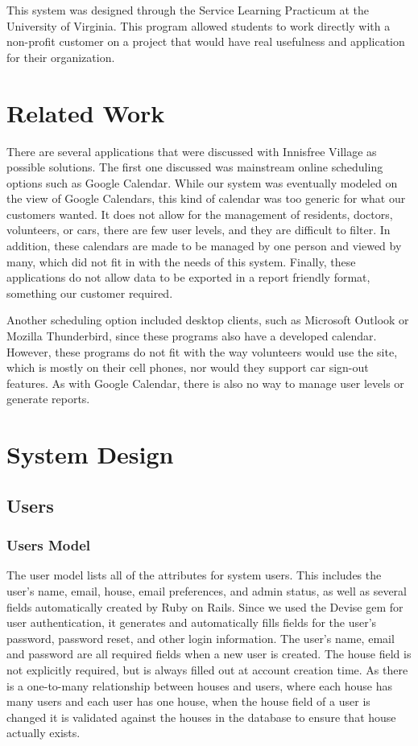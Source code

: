 \documentclass{sig-alternate}
\begin{document}
This system was designed through the Service Learning Practicum at the University of Virginia. This program allowed students to work directly with a non-profit customer on a project that would have real usefulness and application for their organization. 

\section{Related Work}
There are several applications that were discussed with Innisfree Village as possible solutions. The first one discussed was mainstream online scheduling options such as Google Calendar. While our system was eventually modeled on the view of Google Calendars, this kind of calendar was too generic for what our customers wanted. It does not allow for the management of residents, doctors, volunteers, or cars, there are few user levels, and they are difficult to filter. In addition, these calendars are made to be managed by one person and viewed by many, which did not fit in with the needs of this system. Finally, these applications do not allow data to be exported in a report friendly format, something our customer required.

Another scheduling option included desktop clients, such as Microsoft Outlook or Mozilla Thunderbird, since these programs also have a developed calendar. However, these programs do not fit with the way volunteers would use the site, which is mostly on their cell phones, nor would they support car sign-out features. As with Google Calendar, there is also no way to manage user levels or generate reports.

\section{System Design}

\subsection{Users}

\subsubsection{Users Model}
The user model lists all of the attributes for system users. This includes the user’s name, email, house, email preferences, and admin status, as well as several fields automatically created by Ruby on Rails. Since we used the Devise gem \cite{devise} for user authentication, it generates and automatically fills fields for the user's password, password reset, and other login information. The user's name, email and password are all required fields when a new user is created. The house field is not explicitly required, but is always filled out at account creation time. As there is a one-to-many relationship between houses and users, where each house has many users and each user has one house, when the house field of a user is changed it is validated against the houses in the database to ensure that house actually exists.
\end{document}
